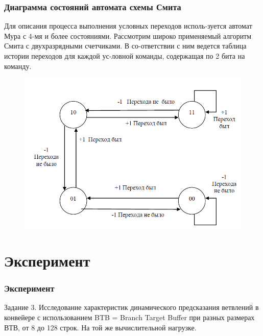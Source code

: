 \documentclass{beamer}
\begin{document}

\begin{frame}

\frametitle{Диаграмма состояний автомата схемы Смита}

Для описания процесса выполнения условных переходов исполь-зуется автомат Мура с 4-мя и более состояниями. Рассмотрим широко применяемый алгоритм Смита с двухразрядными счетчиками. В со-ответствии с ним ведется таблица истории переходов для каждой ус-ловной команды, содержащая по 2 бита на команду.

\begin{figure}
\includegraphics[scale=0.35]{Pic_5}
\end{figure}

\end{frame}

\section{Эксперимент}
\begin{frame}
\frametitle{Эксперимент}

Задание 3. 
Исследование характеристик динамического предсказания ветвлений в конвейере с использованием BTB = Branch Target Buffer при разных размерах ВТВ, от 8 до 128 строк. 
На той же вычислительной нагрузке.

\end{frame}

\end{document}
